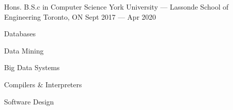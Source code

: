 

\begin{cventries}

  
  \cventry
    {Hons. B.S.c in Computer Science} %
    {York University — Lassonde School of Engineering} %
    {Toronto, ON} %
    {Sept 2017 — Apr 2020} %
    {
      \begin{cvitems} %
        \item {Databases}
        \item {Data Mining}
        \item {Big Data Systems}
        \item {Compilers \& Interpreters}
        \item {Software Design}
      \end{cvitems}
    }
    
  

\end{cventries}
